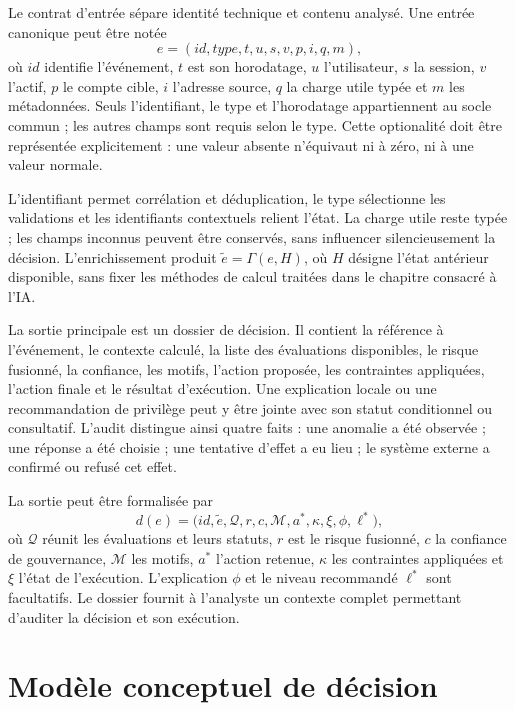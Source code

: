 \documentclass[11pt,a4paper,oneside]{report}
\theoremstyle{definition}
\theoremstyle{plain}
\begin{document}
Le contrat d'entrée sépare identité technique et contenu analysé. Une entrée
canonique peut être notée
\[
e=(\mathit{id},\mathit{type},t,u,s,v,p,i,q,m),
\]
où \(\mathit{id}\) identifie l'événement, \(t\) est son horodatage, \(u\)
l'utilisateur, \(s\) la session, \(v\) l'actif, \(p\) le compte cible, \(i\)
l'adresse source, \(q\) la charge utile typée et \(m\) les métadonnées. Seuls
l'identifiant, le type et l'horodatage appartiennent au socle commun ; les
autres champs sont requis selon le type. Cette optionalité doit être
représentée explicitement : une valeur absente n'équivaut ni à zéro, ni à une
valeur normale.

L'identifiant permet corrélation et déduplication, le type sélectionne les
validations et les identifiants contextuels relient l'état. La charge utile
reste typée ; les champs inconnus peuvent être conservés, sans influencer
silencieusement la décision. L'enrichissement produit
\(\tilde e=\Gamma(e,H)\), où \(H\) désigne l'état antérieur disponible, sans
fixer les méthodes de calcul traitées dans le chapitre consacré à l'IA.

La sortie principale est un dossier de décision. Il contient la référence à
l'événement, le contexte calculé, la liste des évaluations disponibles, le
risque fusionné, la confiance, les motifs, l'action proposée, les contraintes
appliquées, l'action finale et le résultat d'exécution. Une explication locale
ou une recommandation de privilège peut y être jointe avec son statut
conditionnel ou consultatif. L'audit distingue ainsi quatre faits : une anomalie
a été observée ; une réponse a été choisie ; une tentative d'effet a eu lieu ;
le système externe a confirmé ou refusé cet effet.

La sortie peut être formalisée par
\[
d(e)=\bigl(\mathit{id},\tilde e,\mathcal{Q},r,c,\mathcal{M},
           a^*,\kappa,\xi,\phi,\ell^*\bigr),
\]
où \(\mathcal{Q}\) réunit les évaluations et leurs statuts, \(r\) est le risque
fusionné, \(c\) la confiance de gouvernance, \(\mathcal{M}\) les motifs,
\(a^*\) l'action retenue, \(\kappa\) les contraintes appliquées et \(\xi\)
l'état de l'exécution. L'explication \(\phi\) et le niveau recommandé
\(\ell^*\) sont facultatifs. Le dossier fournit à l'analyste un contexte complet
permettant d'auditer la décision et son exécution.

\section{Modèle conceptuel de décision}
\label{sec:method-formal}
\end{document}
